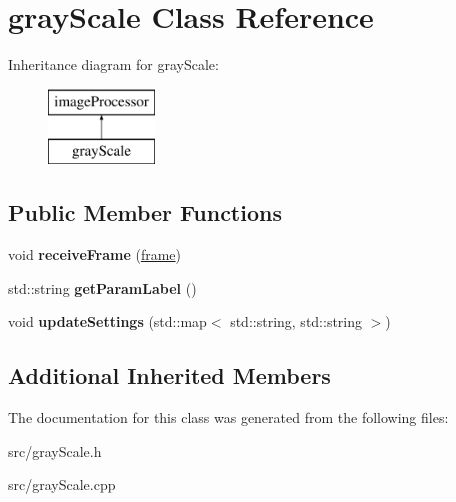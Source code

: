 \hypertarget{classgray_scale}{}\section{gray\+Scale Class Reference}
\label{classgray_scale}
Inheritance diagram for gray\+Scale\+:\begin{figure}[H]
\begin{center}
\leavevmode
\includegraphics[height=2.000000cm]{classgray_scale}
\end{center}
\end{figure}
\subsection*{Public Member Functions}
\begin{DoxyCompactItemize}
\item 
void {\bfseries receive\+Frame} (\hyperlink{classframe}{frame})\hypertarget{classgray_scale_a2c81c1f679fd56fd705ba0dde71415cd}{}\label{classgray_scale_a2c81c1f679fd56fd705ba0dde71415cd}

\item 
std\+::string {\bfseries get\+Param\+Label} ()\hypertarget{classgray_scale_a55a475e399534ec4e5467c24f0503c2b}{}\label{classgray_scale_a55a475e399534ec4e5467c24f0503c2b}

\item 
void {\bfseries update\+Settings} (std\+::map$<$ std\+::string, std\+::string $>$)\hypertarget{classgray_scale_a509b7f89787c663e8a7312e94d54212d}{}\label{classgray_scale_a509b7f89787c663e8a7312e94d54212d}

\end{DoxyCompactItemize}
\subsection*{Additional Inherited Members}


The documentation for this class was generated from the following files\+:\begin{DoxyCompactItemize}
\item 
src/gray\+Scale.\+h\item 
src/gray\+Scale.\+cpp\end{DoxyCompactItemize}
